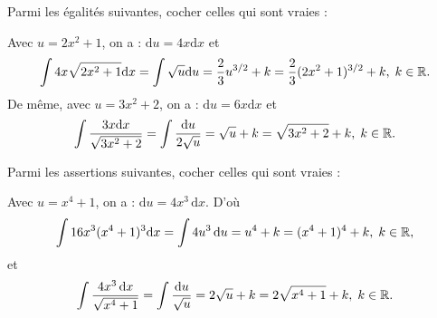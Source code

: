 \begin{question}
Parmi les égalités suivantes, cocher celles qui sont vraies :
\begin{answers}  
\end{answers}
\vskip3mm
\begin{explanations}
Avec $u=2x^2+1$, on a : $\mathrm{d}u=4x\mathrm{d}x$ et
$$\int 4x\sqrt{2x^2+1}\mathrm{d}x=\int \sqrt{u}\mathrm{d}u=\frac{2}{3}u^{3/2}+k=\frac{2}{3}(2x^2+1)^{3/2}+k,\; k\in \mathbb{R}.$$
De m\^eme, avec $u=3x^2+2$, on a : $\mathrm{d}u=6x\mathrm{d}x$ et
$$\int \frac{3x\mathrm{d}x}{\sqrt{3x^2+2}}=\int \frac{\mathrm{d}u}{2\sqrt{u}}=\sqrt{u}+k=\sqrt{3x^2+2}+k,\; k\in \mathbb{R}.$$
\end{explanations}
\end{question}

\begin{question}
Parmi les assertions suivantes, cocher celles qui sont vraies :
\begin{answers}  
\end{answers}
\begin{explanations}
Avec $u=x^4+1$, on a : $\mathrm{d}u=4x^3\, \mathrm{d}x$. D'où
$$\int 16x^3(x^4+1)^3\mathrm{d}x=\int 4u^3\, \mathrm{d}u=u^4+k=(x^4+1)^4+k,\; k\in \mathbb{R},$$
et
$$\int \frac{4x^3\, \mathrm{d}x}{\sqrt{x^4+1}}=\int \frac{\mathrm{d}u}{\sqrt{u}}=2\sqrt{u}+k=2\sqrt{x^4+1}+k,\; k\in \mathbb{R}.$$
\end{explanations}
\end{question}

